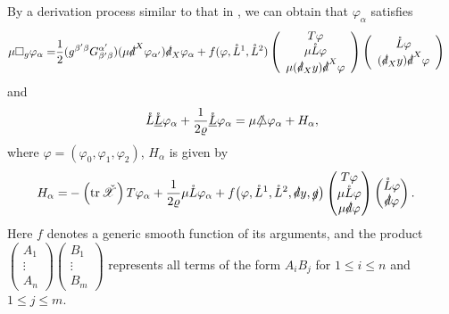\documentclass[11pt,twoside]{article}
\def\al{\alpha}
\def\vp{\varphi}
\def\f{\frac}
\begin{document}
By a derivation process similar to that in \cite[(2.24) and (2.40)-(2.41)]{Ding4}, we can obtain that $\vp_{\alpha}$ satisfies
\begin{equation}\label{ge}
\begin{split}
\mu\Box_g \varphi_\al=&\f12(g^{\beta'\beta}G_{\beta'\beta}^
{\al'})(\mu\slashed d^X\varphi_{\al'})\slashed d_X\varphi_\al+f(\varphi, \mathring L^1, \mathring L^2)\left(
\begin{array}{ccc}
T\varphi\\
\mu\mathring L\varphi\\
\mu(\slashed d_Xy)\slashed d^X\varphi\\
\end{array}
\right)
\left(
\begin{array}{ccc}
\mathring L\varphi\\
(\slashed d_Xy)\slashed d^X\varphi\\
\end{array}
\right)
\end{split}
\end{equation}
and
\begin{equation}\label{fequation}
\mathring{L}\mathring{\underline{L}}\varphi_\al+ \frac{1}{2\varrho}\mathring{\underline{L}}\varphi_\al
= \mu\slashed{\triangle}\varphi_\al + H_\al,
\end{equation}
where $\vp=(\vp_0,\vp_1,\vp_2)$, $H_\al$ is given by
\begin{equation}\label{H}
\begin{split}
H_\al=& -\left(\operatorname{tr}\check{\mathscr X}\right) T\varphi_\al + \frac{1}{2\varrho}\mu\mathring{L}\varphi_\al
+ f\big(\varphi, \mathring{L}^1, \mathring{L}^2, \slashed{d}y, \slashed{g}\big)
\begin{pmatrix}
T\varphi \\
\mu\mathring{L}\varphi \\
\mu\slashed{d}\varphi
\end{pmatrix}
\begin{pmatrix}
\mathring{L}\varphi \\
\slashed{d}\varphi
\end{pmatrix}.
\end{split}
\end{equation}
Here $f$ denotes a generic smooth function of its arguments, and the product
$
\begin{pmatrix} A_1 \\ \vdots \\ A_n \end{pmatrix}
\begin{pmatrix} B_1 \\ \vdots \\ B_m \end{pmatrix}
$
represents all terms of the form $A_iB_j$ for $1 \leq i \leq n$ and $1 \leq j \leq m$.
\end{document}
